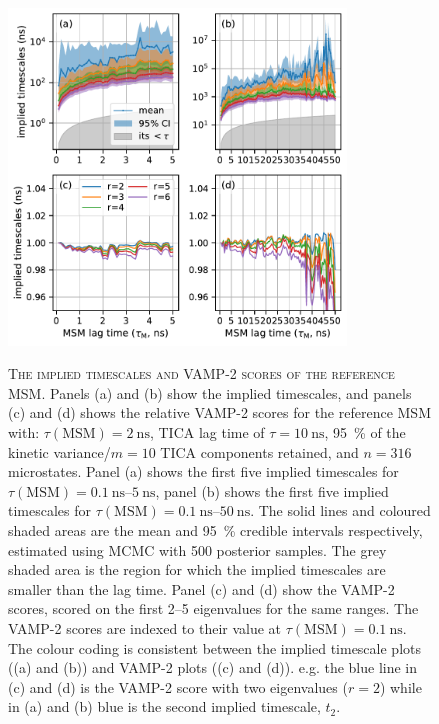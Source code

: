 \begin{figure}[ht!]
 \centering
    \caption[The implied timescales and VAMP-2 scores of the sensitivity reference MSM]{\textsc{The implied timescales and VAMP-2 scores of the reference MSM}. Panels (a) and (b) show the implied timescales, and panels (c) and (d) shows the relative VAMP-2 scores for the reference MSM with: $\tau(\textrm{MSM})=\SI{2}{\nano\second}$, TICA lag time of $\tau=\SI{10}{\nano\second}$, \SI{95}{\percent} of the kinetic variance/$m=10$ TICA components retained, and $n=316$ microstates. Panel (a) shows the first five implied timescales for $\tau(\mathrm{MSM})=\SIrange[range-phrase=--]{0.1}{5}{\nano\second}$, panel (b) shows the first five implied timescales for $\tau(\mathrm{MSM}) = \SIrange[range-phrase]{0.1}{50}{\nano\second}$. The solid lines and coloured shaded areas are the mean and \SI{95}{\percent} credible intervals respectively, estimated using MCMC with \num{500} posterior samples. The grey shaded area is the region for which the implied timescales are smaller than the lag time. Panel (c) and (d) show the VAMP-2 scores, scored on the first \numrange{2}{5} eigenvalues for the same ranges. The VAMP-2 scores are indexed to their value at $\tau(\mathrm{MSM})=\SI{0.1}{\nano\second}$. The colour coding is consistent between the implied timescale plots ((a) and (b)) and VAMP-2 plots ((c) and (d)). e.g. the blue line in (c) and (d) is the VAMP-2 score with two eigenvalues ($r=2$) while in (a) and (b) blue is the second implied timescale, $t_{2}$.}
 \includegraphics[width=0.8\textwidth]{chapters/aadh/figures/implied_timescales_D_sens.pdf}
 \label{fig:its_d_sens}
\end{figure}

